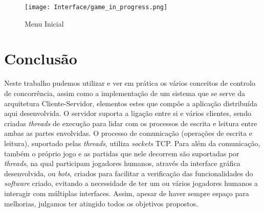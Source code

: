 \documentclass{llncs}
\begin{document}
\begin{figure}[H]
\centering
\texttt{[image: Interface/game\_in\_progress.png]}
\caption{Menu Inicial}
\label{menu_jogo}
\end{figure}


\section{Conclusão}
Neste trabalho pudemos utilizar e ver em prática os vários conceitos de controlo de concorrência, assim como a implementação de um sistema que se serve da arquitetura Cliente-Servidor, elementos estes 
que compõe a aplicação distribuída aqui desenvolvida. O servidor suporta a ligação entre si e vários clientes, sendo criadas \textit{threads} de execução para lidar com os processos de escrita e leitura 
entre ambas as partes envolvidas. O processo de comunicação (operações de escrita e leitura), suportado pelas \textit{threads}, utiliza \textit{sockets} TCP. Para além da comunicação, também o próprio jogo 
e as partidas que nele decorrem são suportadas por \textit{threads}, na qual participam jogadores humanos, através da interface gráfica desenvolvida, ou \textit{bots}, criados para facilitar a verificação das 
funcionalidades do \textit{software} criado, evitando a necessidade de ter um ou vários jogadores humanos a interagir com múltiplas interfaces. Assim, apesar de haver sempre espaço para melhorias, julgamos ter atingido todos os objetivos propostos.
\end{document}
